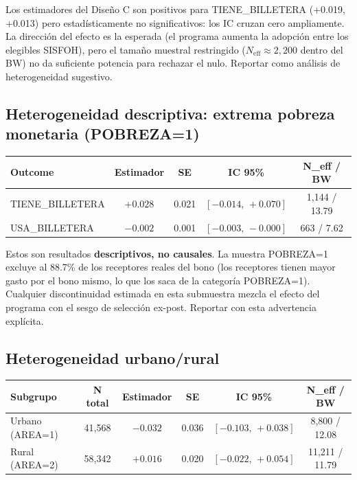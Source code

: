 \documentclass[12pt, a4paper]{article}
\begin{document}
\begin{interpcaja}
Los estimadores del Diseño C son positivos para TIENE\_BILLETERA (+0.019,
+0.013) pero estadísticamente no significativos: los IC cruzan cero
ampliamente. La dirección del efecto es la esperada (el programa aumenta
la adopción entre los elegibles SISFOH), pero el tamaño muestral restringido
($N_{\text{eff}} \approx 2{,}200$ dentro del BW) no da suficiente potencia
para rechazar el nulo. Reportar como análisis de heterogeneidad sugestivo.
\end{interpcaja}

\subsection{Heterogeneidad descriptiva: extrema pobreza monetaria (POBREZA=1)}

\begin{center}
\begin{tabular}{lcccc}
\toprule
Outcome & Estimador & SE & IC 95\% & N\_eff / BW \\
\midrule
TIENE\_BILLETERA & $+0.028$ & 0.021 & $[-0.014,\,+0.070]$ & 1{,}144 / 13.79 \\
USA\_BILLETERA & $-0.002$ & 0.001 & $[-0.003,\,-0.000]$ & 663 / 7.62 \\
\bottomrule
\end{tabular}
\end{center}

\begin{alertcaja}
Estos son resultados \textbf{descriptivos, no causales}. La muestra POBREZA=1
excluye al 88.7\% de los receptores reales del bono (los receptores tienen
mayor gasto por el bono mismo, lo que los saca de la categoría
POBREZA=1). Cualquier discontinuidad estimada en esta submuestra mezcla
el efecto del programa con el sesgo de selección ex-post. Reportar con
esta advertencia explícita.
\end{alertcaja}

\subsection{Heterogeneidad urbano/rural}

\begin{center}
\begin{tabular}{lccccc}
\toprule
Subgrupo & N total & Estimador & SE & IC 95\% & N\_eff / BW \\
\midrule
Urbano (AREA=1) & 41{,}568 & $-0.032$ & 0.036 & $[-0.103,\,+0.038]$ & 8{,}800 / 12.08 \\
Rural (AREA=2) & 58{,}342 & $+0.016$ & 0.020 & $[-0.022,\,+0.054]$ & 11{,}211 / 11.79 \\
\bottomrule
\end{tabular}
\end{center}
\end{document}
